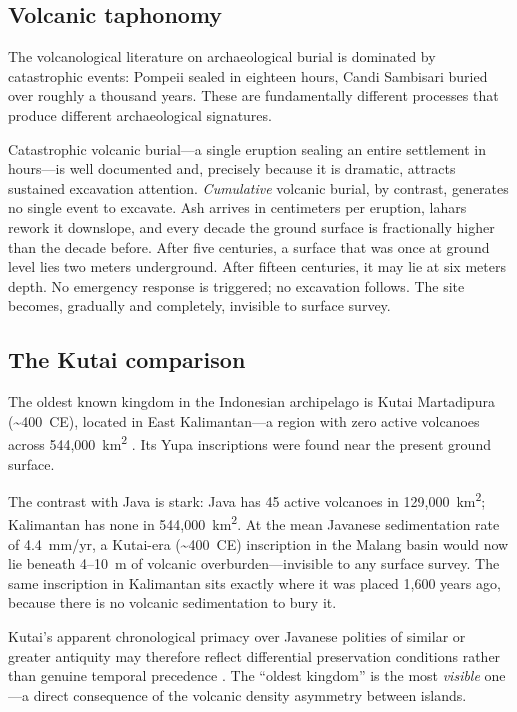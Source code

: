 \documentclass[12pt,a4paper]{article}
\begin{document}
\subsection{Volcanic taphonomy}

The volcanological literature on archaeological burial is dominated by catastrophic events: Pompeii sealed in eighteen hours, Candi Sambisari buried over roughly a thousand years. These are fundamentally different processes that produce different archaeological signatures.

Catastrophic volcanic burial---a single eruption sealing an entire settlement in hours---is well documented \citep{sigurdsson1985,doumas1983,sheets1992} and, precisely because it is dramatic, attracts sustained excavation attention. \textit{Cumulative} volcanic burial, by contrast, generates no single event to excavate. Ash arrives in centimeters per eruption, lahars rework it downslope, and every decade the ground surface is fractionally higher than the decade before. After five centuries, a surface that was once at ground level lies two meters underground. After fifteen centuries, it may lie at six meters depth. No emergency response is triggered; no excavation follows. The site becomes, gradually and completely, invisible to surface survey.

\subsection{The Kutai comparison}

The oldest known kingdom in the Indonesian archipelago is Kutai Martadipura (\textasciitilde400~CE), located in East Kalimantan---a region with zero active volcanoes across 544,000~km\textsuperscript{2} \citep{vogel1918}. Its Yupa inscriptions were found near the present ground surface.

The contrast with Java is stark: Java has 45 active volcanoes in 129,000~km\textsuperscript{2}; Kalimantan has none in 544,000~km\textsuperscript{2}. At the mean Javanese sedimentation rate of 4.4~mm/yr, a Kutai-era (\textasciitilde400~CE) inscription in the Malang basin would now lie beneath 4--10~m of volcanic overburden---invisible to any surface survey. The same inscription in Kalimantan sits exactly where it was placed 1,600 years ago, because there is no volcanic sedimentation to bury it.

Kutai's apparent chronological primacy over Javanese polities of similar or greater antiquity may therefore reflect differential preservation conditions rather than genuine temporal precedence \citep{coedes1968,miksic2004}. The ``oldest kingdom'' is the most \textit{visible} one---a direct consequence of the volcanic density asymmetry between islands.
\end{document}
